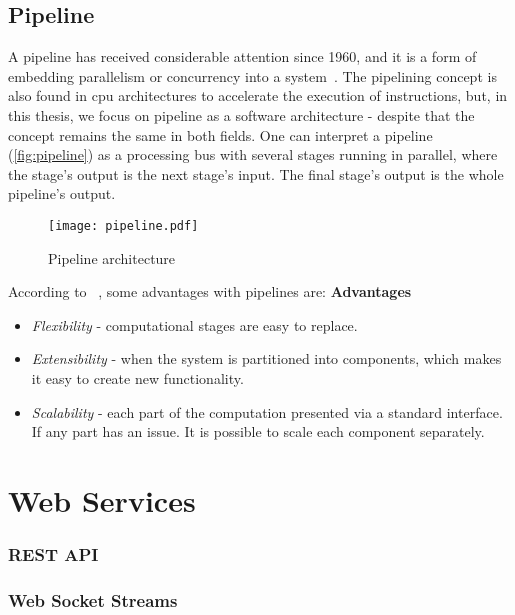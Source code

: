 \subsection{Pipeline}
A pipeline has received considerable attention since 1960, and it is a form of embedding parallelism or concurrency into a system~\cite{ramamoorthy1977pipeline}. The pipelining concept is also found in \ac{cpu} architectures to accelerate the execution of instructions, but, in this thesis, we focus on pipeline as a software architecture - despite that the concept remains the same in both fields. One can interpret a pipeline (\autoref{fig:pipeline}) as a processing bus with several stages running in parallel, where the stage's output is the next stage's input. The final stage's output is the whole pipeline's output.

\begin{figure}
    \centering
    \texttt{[image: pipeline.pdf]}
    \caption{Pipeline architecture}
    \label{fig:pipeline}
\end{figure}

According to ~\cite{ml_pipeline_1}, some advantages with pipelines are:
\textbf{Advantages}
\begin{itemize}
    \item \emph{Flexibility} - computational stages are easy to replace. 
    \item \emph{Extensibility} - when the system is partitioned into components, which makes it easy to create new functionality.
    \item \emph{Scalability} - each part of the computation presented via a standard interface. If any part has an issue. It is possible to scale each component separately.
\end{itemize}

\section{Web Services}

\subsubsection{REST API}

\subsubsection{Web Socket Streams}

